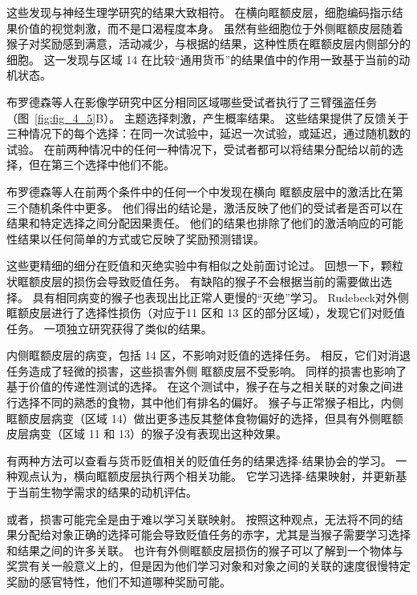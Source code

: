 这些发现与神经生理学研究的结果大致相符。
在横向眶额皮层，细胞编码指示结果价值的视觉刺激，而不是口渴程度本身\cite{bouret2010ventromedial}。
虽然有些细胞位于外侧眶额皮层随着猴子对奖励感到满意，活动减少，与根据\cite{critchley1996hunger}的结果，这种性质在眶额皮层内侧部分的细胞\cite{bouret2010ventromedial}。
这一发现与区域 14 在比较“通用货币”的结果值中的作用一致基于当前的动机状态。\par


布罗德森等人\cite{brodersenorbitofrontal}在影像学研究中区分相同区域哪些受试者执行了三臂强盗任务（图~\ref{fig:fig_4_5}B）。
主题选择刺激，产生概率结果。
这些结果提供了反馈关于三种情况下的每个选择：在同一次试验中，延迟一次试验，或延迟，通过随机数的试验。
在前两种情况中的任何一种情况下，受试者都可以将结果分配给以前的选择，但在第三个选择中他们不能。\par


布罗德森等人在前两个条件中的任何一个中发现在横向 眶额皮层中的激活比在第三个随机条件中更多。
他们得出的结论是，激活反映了他们的受试者是否可以在结果和特定选择之间分配因果责任。
他们的结果也排除了他们的激活响应的可能性结果以任何简单的方式或它反映了奖励预测错误。\par


这些更精细的细分在贬值和灭绝实验中有相似之处前面讨论过。
回想一下，颗粒状眶额皮层的损伤会导致贬值任务。
有缺陷的猴子不会根据当前的需要做出选择。
具有相同病变的猴子也表现出比正常人更慢的“灭绝”学习。
Rudebeck\cite{rudebeck2011dissociable}对外侧眶额皮层进行了选择性损伤（对应于11 区和 13 区的部分区域），发现它们对贬值任务。
一项独立研究获得了类似的结果\cite{machado2007effects}。\par


内侧眶额皮层的病变，包括 14 区，不影响对贬值的选择任务。
相反，它们对消退任务造成了轻微的损害，这些损害外侧 眶额皮层不受影响。
同样的损害也影响了基于价值的传递性测试的选择。
在这个测试中，猴子在与之相关联的对象之间进行选择不同的熟悉的食物，其中他们有排名的偏好。
猴子与正常猴子相比，内侧眶额皮层病变（区域 14）做出更多违反其整体食物偏好的选择，但具有外侧眶额皮层病变（区域 11 和 13）的猴子没有表现出这种效果\cite{rudebeck2011dissociable}。\par


有两种方法可以查看与货币贬值相关的贬值任务的结果选择-结果协会的学习。
一种观点认为，横向眶额皮层执行两个相关功能。
它学习选择-结果映射，并更新基于当前生物学需求的结果的动机评估。\par


或者，损害可能完全是由于难以学习关联映射。
按照这种观点，无法将不同的结果分配给对象正确的选择可能会导致贬值任务的赤字，尤其是当猴子需要学习选择和结果之间的许多关联。
也许有外侧眶额皮层损伤的猴子可以了解到一个物体与奖赏有关一般意义上的，但是因为他们学习对象和对象之间的关联的速度很慢特定奖励的感官特性，他们不知道哪种奖励可能。\par



